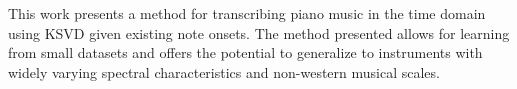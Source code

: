 This work presents a method for transcribing piano music in the time domain using \ac{KSVD} given existing note onsets. The method presented allows for learning from small datasets and offers the potential to generalize to instruments with widely varying spectral characteristics and non-western musical scales.
